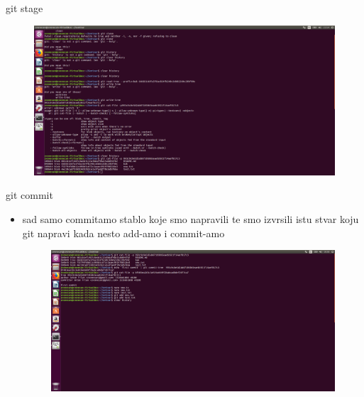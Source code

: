 \documentclass[]{beamer}
\begin{document}
\begin{frame}{git stage}
	\begin{figure}
		\centering
	\includegraphics[width=1\textwidth]{./slike/sesta_slika.jpg}
	\end{figure}


\end{frame}

\begin{frame}{git commit}

\begin{itemize}
	\item sad samo commitamo stablo koje smo napravili te smo izvrsili istu stvar koju git napravi kada nesto add-amo i commit-amo
	\begin{figure}
		\centering
	\includegraphics[width=1\textwidth]{./slike/sedma_slika.jpg}
	\end{figure}
\end{itemize}
\end{frame}
\end{document}
